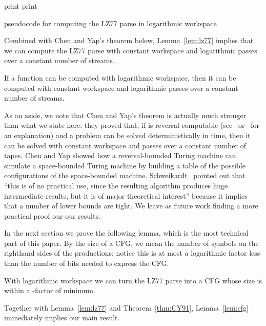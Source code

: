 \documentclass[runningheads]{llncs}
\begin{document}
\begin{algorithm}[t]
\;
\While{}
    {\;
    \;
    \For{}
        {\;
        \While{}
            {\;}
        \If{}
            {\;
            \;}}
    \eIf{}
        {print \;
        \;}
        {print \;
        \;}}
\BlankLine
\BlankLine

\caption{pseudocode for computing the LZ77 parse in logarithmic workspace}
\label{alg:parse}
\end{algorithm}

Combined with Chen and Yap's theorem below, Lemma~\ref{lem:lz77} implies that we can compute the LZ77 parse with constant workspace and logarithmic passes over a constant number of streams.

\begin{theorem} \label{thm:CY91}
If a function can be computed with logarithmic workspace, then it can be computed with constant workspace and logarithmic passes over a constant number of streams.
\end{theorem}

As an aside, we note that Chen and Yap's theorem is actually much stronger than what we state here: they proved that, if  is reversal-computable (see~\cite{CY91} or~\cite{HS08} for an explanation) and a problem can be solved deterministically in  time, then it can be solved with constant workspace and  passes over a constant number of tapes.  Chen and Yap showed how a reversal-bounded Turing machine can simulate a space-bounded Turing machine by building a table of the possible configurations of the space-bounded machine.  Schweikardt~\cite{Sch07} pointed out that ``this is of no practical use, since the resulting algorithm produces huge intermediate results, but it is of major theoretical interest'' because it implies that a number of lower bounds are tight.  We leave as future work finding a more practical proof our our results.

In the next section we prove the following lemma, which is the most technical part of this paper.  By the size of a CFG, we mean the number of symbols on the righthand sides of the productions; notice this is at most a logarithmic factor less than the number of bits needed to express the CFG.

\begin{lemma} \label{lem:cfg}
With logarithmic workspace we can turn the LZ77 parse into a CFG whose size is within a -factor of minimum.
\end{lemma}

\noindent Together with Lemma~\ref{lem:lz77} and Theorem~\ref{thm:CY91}, Lemma~\ref{lem:cfg} immediately implies our main result.
\end{document}
